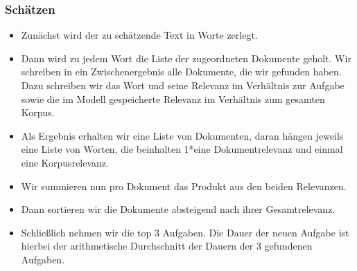 \subsubsection{Schätzen}

\begin{itemize}
        \tightlist
        \item Zunächst wird der zu schätzende Text in Worte zerlegt.
        \item Dann wird zu jedem Wort die Liste der zugeordneten Dokumente geholt. Wir schreiben in ein Zwischenergebnis alle Dokumente, die wir gefunden haben. Dazu schreiben wir das Wort und seine Relevanz im Verhältnis zur Aufgabe sowie die im Modell gespeicherte Relevanz im Verhältnis zum gesamten Korpus.
        \item Als Ergebnis erhalten wir eine Liste von Dokumenten, daran hängen jeweils eine Liste von Worten, die beinhalten 1*eine Dokumentrelevanz und einmal eine Korpusrelevanz.
        \item Wir summieren nun pro Dokument das Produkt aus den beiden Relevanzen.
        \item Dann sortieren wir die Dokumente absteigend nach ihrer Gesamtrelevanz.
        \item Schließlich nehmen wir die top 3 Aufgaben. Die Dauer der neuen Aufgabe ist hierbei der arithmetische Durchschnitt der Dauern der 3 gefundenen Aufgaben.
\end{itemize}



